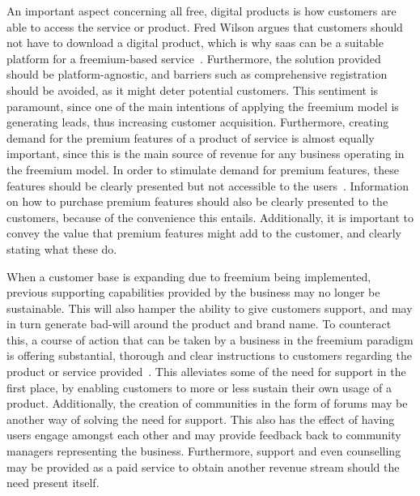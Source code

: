 An important aspect concerning all free, digital products is how customers are able to access the service or product. Fred Wilson argues that customers should not have to download a digital product, which is why \gls{saas} can be a suitable platform for a freemium-based service~\cite{fredwilson2006}. Furthermore, the solution provided should be platform-agnostic, and barriers such as comprehensive registration should be avoided, as it might deter potential customers. This sentiment is paramount, since one of the main intentions of applying the freemium model is generating leads, thus increasing customer acquisition. Furthermore, creating demand for the premium features of a product of service is almost equally important, since this is the main source of revenue for any business operating in the freemium model. In order to stimulate demand for premium features, these features should be clearly presented but not accessible to the users~\cite{bogdanpopescu2008}. Information on how to purchase premium features should also be clearly presented to the customers, because of the convenience this entails. Additionally, it is important to convey the value that premium features might add to the customer, and clearly stating what these do. 


When a customer base is expanding due to freemium being implemented, previous supporting capabilities provided by the business may no longer be sustainable. This will also hamper the ability to give customers support, and may in turn generate bad-will around the product and brand name. To counteract this, a course of action that can be taken by a business in the freemium paradigm is offering substantial, thorough and clear instructions to customers regarding the product or service provided~\cite{brucehadley2003}. This alleviates some of the need for support in the first place, by enabling customers to more or less sustain their own usage of a product. Additionally, the creation of communities in the form of forums may be another way of solving the need for support. This also has the effect of having users engage amongst each other and may provide feedback back to community managers representing the business. Furthermore, support and even counselling may be provided as a paid service to obtain another revenue stream should the need present itself. 

